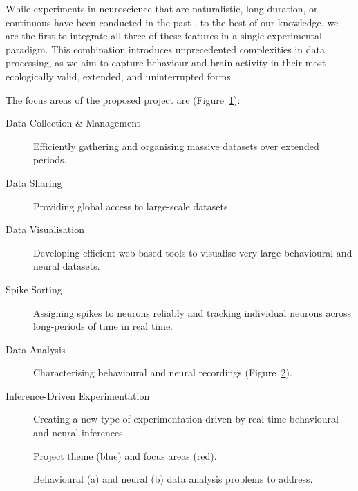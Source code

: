 While experiments in neuroscience that are naturalistic, long-duration, or
continuous have been conducted in the past
\citep[e.g.,][]{jhuangEtAl10,maoEtAl21,volohEtAl23}, to the best of our
knowledge, we are the first to integrate all three of these features in a
single experimental paradigm.
%
This combination introduces unprecedented complexities in data processing, as
we aim to capture behaviour and brain activity in their most ecologically valid,
extended, and uninterrupted forms.

The focus areas of the proposed project are (Figure~\ref{fig:focusAreas}):

\begin{description}

    \item[Data Collection \& Management] Efficiently gathering and organising
        massive datasets over extended periods.

    \item[Data Sharing] Providing global access to large-scale datasets.

    \item[Data Visualisation] Developing efficient web-based tools to visualise
        very large behavioural and neural datasets.

    \item[Spike Sorting] Assigning spikes to neurons reliably and tracking
        individual neurons across long-periods of time in real time.

    \item[Data Analysis] Characterising behavioural and neural recordings
        (Figure~\ref{fig:dataAnalysis}).

    \item[Inference-Driven Experimentation] Creating a new type of
        experimentation driven by real-time behavioural and neural inferences.

\end{description}

\begin{figure}
    \begin{center}
        \resizebox{4.0in}{!}{%
            
        }
    \end{center}
    \caption{Project theme (blue) and focus areas (red).}
    \label{fig:focusAreas}
\end{figure}

\begin{figure}
    \centering
    \subfloat[]{
        \resizebox{3.0in}{!}{%
            
        }
    }
    \hfill
    \subfloat[]{
        \resizebox{2.25in}{!}{%
            
        }
    }
    \caption{Behavioural (a) and neural (b) data analysis problems to address.}
    \label{fig:dataAnalysis}
\end{figure}

